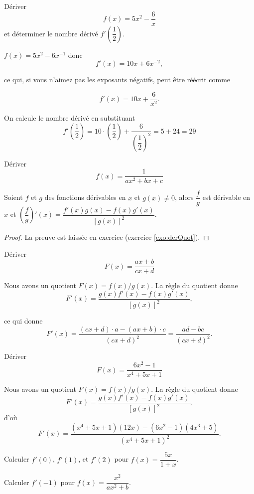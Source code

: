 \documentclass[a4paper,12pt]{article}
\begin{document}
\begin{exemple}
   \tcblower
  Dériver 
   $$f(x) = 5x^2 - \frac{6}{x}$$ et déterminer le nombre dérivé $f'\left(\dfrac{1}{2}\right)$.

   $f(x) = 5x^2 - 6x^{-1}$ donc
   $$f'(x) = 10x + 6x^{-2},$$
   
   ce qui, si vous n'aimez pas les exposants négatifs, peut être réécrit comme

   $$f'(x) = 10x + \frac{6}{x^2}.$$

   On calcule le nombre dérivé en substituant 
   \[f'\left(\dfrac{1}{2}\right)=10\cdot \left(\dfrac{1}{2}\right) + \dfrac{6}{\left(\dfrac{1}{2}\right)^2}=5+24=29\]
\end{exemple}

\begin{exemple}
	\tcblower
	Dériver 
	\[f(x)=\dfrac{1}{ax^2+bx+c}\]
	\vspace{6cm}
\end{exemple}
\begin{prop}[label=prop:derQuot]
   \tcblower
   Soient $f$ et $g$ des fonctions dérivables en $x$ et $g(x)\neq 0$, alors $\dfrac{f}{g}$ est dérivable en $x$ et $\left(\dfrac{f}{g}\right)'(x)=\dfrac{f'(x)g(x)-f(x)g'(x)}{[g(x)]^2}$. 
   \medskip

   \begin{proof}
	   La preuve est laissée en exercice (exercice \ref{exo:derQuot}).
   \end{proof}
\end{prop}

\begin{exemple}
   \tcblower
  Dériver 
   $$F(x) = \frac{ax+b}{cx+d}$$
   
Nous avons un quotient $F(x) = f(x)/g(x)$. La règle du quotient donne
   $$F'(x) = \frac{g(x)f'(x) - f(x)g'(x)}{[g(x)]^2},$$
   
   ce qui donne
   $$F'(x) = \frac{(cx+d) \cdot a - (ax+b) \cdot c}{(cx+d)^2} = \frac{ad - bc}{(cx+d)^2}.$$
\end{exemple}
\begin{exemple}
	\tcblower
Dériver	
	$$F(x) = \frac{6x^2 - 1}{x^4 + 5x + 1}$$
	
Nous avons un quotient $F(x) = f(x)/g(x)$. La règle du quotient donne
	$$F'(x) = \frac{g(x)f'(x) - f(x)g'(x)}{[g(x)]^2},$$
	d'où
	$$F'(x) = \frac{(x^4 + 5x + 1)(12x) - (6x^2 - 1)(4x^3 + 5)}{(x^4 + 5x + 1)^2}.$$
\end{exemple}
\begin{exemple}
	\tcblower
	Calculer $f'(0)$, $f'(1)$, et $f'(2)$ pour $f(x) = \dfrac{5x}{1+x}$.
	
	\vspace{5cm}

\end{exemple}
\begin{exemple}
	\tcblower
	Calculer $f'(-1)$ pour $f(x) = \dfrac{x^2}{ax^2 + b}$.
	
	\vspace{5.5cm}
\end{exemple}
\end{document}
